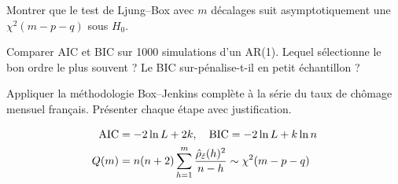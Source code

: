 \begin{exercice}[$\star\star$]
Montrer que le test de Ljung--Box avec $m$ d\'ecalages suit asymptotiquement une $\chi^2(m-p-q)$ sous $H_0$.
\end{exercice}

\begin{exercice}[$\star\star$]
Comparer AIC et BIC sur 1000 simulations d'un AR(1). Lequel s\'electionne le bon ordre le plus souvent ? Le BIC sur-p\'enalise-t-il en petit \'echantillon ?
\end{exercice}

\begin{exercice}
Appliquer la m\'ethodologie Box--Jenkins compl\`ete \`a la s\'erie du taux de ch\^omage mensuel fran\c{c}ais. Pr\'esenter chaque \'etape avec justification.
\end{exercice}

\begin{formules}
\begin{align*}
\operatorname{AIC} &= -2\ln L + 2k, \quad \operatorname{BIC} = -2\ln L + k\ln n \\
Q(m) &= n(n+2)\sum_{h=1}^m\frac{\hat\rho_{\hat{\varepsilon}}(h)^2}{n-h}\sim\chi^2(m-p-q)
\end{align*}
\end{formules}
